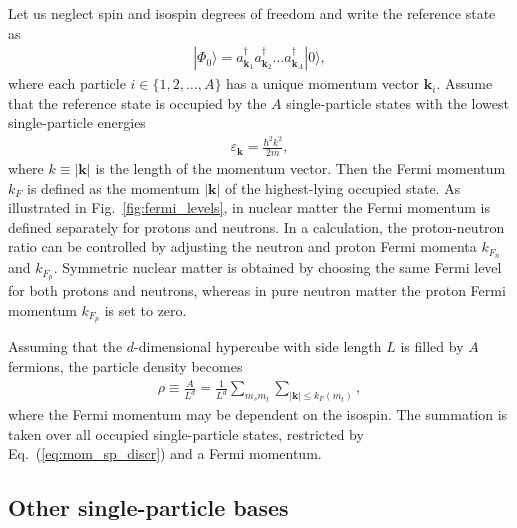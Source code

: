 \documentclass[a4paper,12pt]{report}
\begin{document}
Let us neglect spin and isospin degrees of freedom and write the reference state as
\begin{align}
  |\Phi_{0}\rangle = a_{\mathbf{k}_{1}}^{\dagger }a_{\mathbf{k}_{2}}^{\dagger }\dots a_{\mathbf{k}_{A}}^{\dagger }|0\rangle , 
\end{align}
where each particle $i \in \{ 1, 2, \dots , A\}$ has a unique momentum vector $\mathbf{k}_{i}$. Assume that the reference state is occupied by the $A$ single-particle states with the lowest single-particle energies 
\begin{align}
  \varepsilon_{\mathbf{k}} = \frac{\hbar^{2}k^{2}}{2m},
\end{align}
where $k \equiv |\mathbf{k}|$ is the length of the momentum vector. Then the Fermi momentum $k_{F}$ is defined as the momentum $|\mathbf{k}|$ of the highest-lying occupied state. As illustrated in Fig.~\ref{fig:fermi_levels}, in nuclear matter the Fermi momentum is defined separately for protons and neutrons. In a calculation, the proton-neutron ratio can be controlled by adjusting the neutron and proton Fermi momenta $k_{F_{n}}$ and $k_{F_{p}}$. Symmetric nuclear matter is obtained by choosing the same Fermi level for both protons and neutrons, whereas in pure neutron matter the proton Fermi momentum $k_{F_{p}}$ is set to zero. 

Assuming that the $d$-dimensional hypercube with side length $L$ is filled by $A$ fermions, the particle density becomes
\begin{align}
  \rho \equiv \frac{A}{L^{d}} = \frac{1}{L^{d}}\sum_{m_{s}m_{t}}\sum_{|\mathbf{k}|\leq k_{F}(m_{t})},
  \label{eq:density_discr}
\end{align}
where the Fermi momentum may be dependent on the isospin. The summation is taken over all occupied single-particle states, restricted by Eq.~(\ref{eq:mom_sp_discr}) and a Fermi momentum.  





\subsection{Other single-particle bases} \label{eq:other_sp_b}
\end{document}
